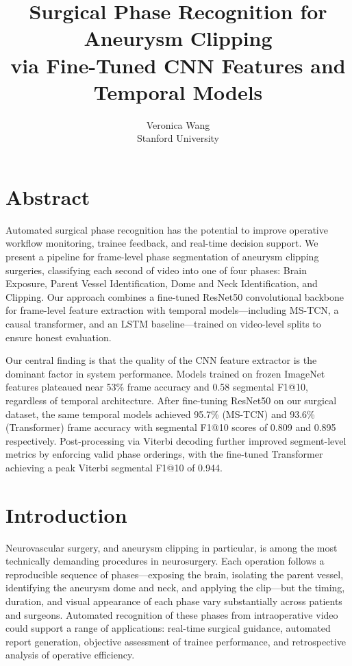 \documentclass[10pt,twocolumn]{article}
\title{\textbf{Surgical Phase Recognition for Aneurysm Clipping\\
via Fine-Tuned CNN Features and Temporal Models}}
\author{Veronica Wang\\
Stanford University}
\date{}
\begin{document}
\maketitle

\section*{Abstract}

Automated surgical phase recognition has the potential to improve operative workflow monitoring, trainee feedback, and real-time decision support. We present a pipeline for frame-level phase segmentation of aneurysm clipping surgeries, classifying each second of video into one of four phases: Brain Exposure, Parent Vessel Identification, Dome and Neck Identification, and Clipping. Our approach combines a fine-tuned ResNet50 convolutional backbone for frame-level feature extraction with temporal models—including MS-TCN, a causal transformer, and an LSTM baseline—trained on video-level splits to ensure honest evaluation.

Our central finding is that the quality of the CNN feature extractor is the dominant factor in system performance. Models trained on frozen ImageNet features plateaued near 53\% frame accuracy and 0.58 segmental F1@10, regardless of temporal architecture. After fine-tuning ResNet50 on our surgical dataset, the same temporal models achieved 95.7\% (MS-TCN) and 93.6\% (Transformer) frame accuracy with segmental F1@10 scores of 0.809 and 0.895 respectively. Post-processing via Viterbi decoding further improved segment-level metrics by enforcing valid phase orderings, with the fine-tuned Transformer achieving a peak Viterbi segmental F1@10 of 0.944.

\section{Introduction}

Neurovascular surgery, and aneurysm clipping in particular, is among the most technically demanding procedures in neurosurgery. Each operation follows a reproducible sequence of phases—exposing the brain, isolating the parent vessel, identifying the aneurysm dome and neck, and applying the clip—but the timing, duration, and visual appearance of each phase vary substantially across patients and surgeons. Automated recognition of these phases from intraoperative video could support a range of applications: real-time surgical guidance, automated report generation, objective assessment of trainee performance, and retrospective analysis of operative efficiency.
\end{document}
